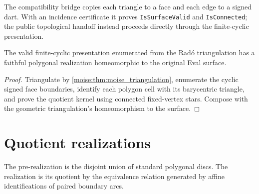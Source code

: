 \begin{definition}
\label{moise:def:triangulation_cell_complex}
\leanok
{}
The compatibility bridge copies each triangle to a face and each edge to a
signed dart. With an incidence certificate it proves \texttt{IsSurfaceValid}
and \texttt{IsConnected}; the public topological handoff instead proceeds
directly through the finite-cyclic presentation.
\end{definition}

\begin{theorem}
\label{moise:thm:compact_surface_cellulable}
\leanok
{}
The valid finite-cyclic presentation enumerated from the Rad\'o triangulation
has a faithful polygonal realization homeomorphic to the original Eval
surface.
\end{theorem}

\begin{proof}
\leanok
Triangulate by \ref{moise:thm:moise_triangulation}, enumerate the cyclic signed
face boundaries, identify each polygon cell with its barycentric triangle, and
prove the quotient kernel using connected fixed-vertex stars. Compose with the
geometric triangulation's homeomorphism to the surface.
\end{proof}

\section{Quotient realizations}

\begin{definition}
\label{moise:def:gluing_relation}
\leanok
The pre-realization is the disjoint union of standard polygonal discs. The
realization is its quotient by the equivalence relation generated by affine
identifications of paired boundary arcs.
\end{definition}

